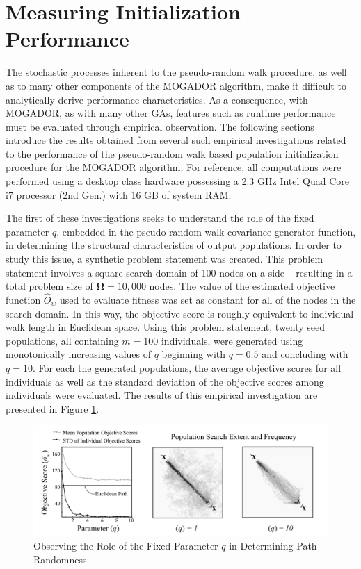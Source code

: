 \section{Measuring Initialization Performance}
    
The stochastic processes inherent to the pseudo-random walk procedure, as well as to many other components of the MOGADOR algorithm, make it difficult to analytically derive performance characteristics. As a consequence, with MOGADOR, as with many other GAs, features such as runtime performance must be evaluated through empirical observation. The following sections introduce the results obtained from several such empirical investigations related to the performance of the pseudo-random walk based population initialization procedure for the MOGADOR algorithm. For reference, all computations were performed using a desktop class hardware possessing a 2.3 GHz Intel Quad Core i7 processor (2nd Gen.) with 16 GB of system RAM.
            
The first of these investigations seeks to understand the role of the fixed parameter $q$, embedded in the pseudo-random walk covariance generator function, in determining the structural characteristics of output populations. In order to study this issue, a synthetic problem statement was created. This problem statement involves a square search domain of 100 nodes on a side – resulting in a total problem size of $\boldsymbol\Omega = 10,000$ nodes. The value of the estimated objective function $\hat{O}_w$ used to evaluate fitness was set as constant for all of the nodes in the search domain. In this way, the objective score is roughly equivalent to individual walk length in Euclidean space. Using this problem statement, twenty seed populations, all containing $m = 100$ individuals, were generated  using monotonically increasing values of $q$ beginning with $q = 0.5$ and concluding with $q = 10$. For each the generated populations, the average objective scores for all individuals as well as the standard deviation of the objective scores among individuals were evaluated. The results of this empirical investigation are presented in Figure \ref{fig:path-randomness}.
            
            \begin{figure}[!h]
            \centering
            \includegraphics[width=5.5in]{figures/path-randomness-study.png}
            \caption[Observing the Role of the Fixed Parameter $q$ in Determining Individual Path Randomness]{Observing the Role of the Fixed Parameter $q$ in Determining Path Randomness}
            \label{fig:path-randomness}
            \end{figure}
            
